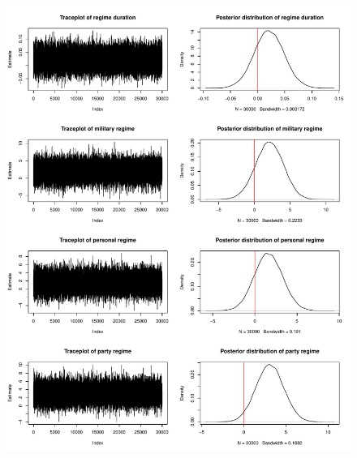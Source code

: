 \begin{figure}[ht]
    \centering
    \includegraphics[width=\textwidth]{../fig/mcmc_diagnostic2}
    \label{fig:mcmc_diagnostic2}
\end{figure}

